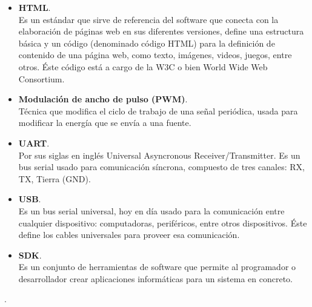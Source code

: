 \begin{itemize}
	\item \textbf{HTML}. \\
Es un estándar que sirve de referencia del software que conecta con la 
elaboración de páginas web en sus diferentes versiones, define una estructura 
básica y un código (denominado código HTML) para la definición de contenido de 
una página web, como texto, imágenes, videos, juegos, entre otros. Éste código 
está a cargo de la W3C o bien World Wide Web Consortium.

	\item \textbf{Modulación de ancho de pulso (PWM)}. \\
Técnica que modifica el ciclo de trabajo de una señal periódica, usada para 
modificar la energía que se envía a una fuente.

	\item \textbf{UART}. \\
Por sus siglas en inglés Universal Asyncronous Receiver/Transmitter. Es un bus
serial usado para comunicación síncrona, compuesto de tres canales: RX, TX, 
Tierra (GND).

	\item \textbf{USB}. \\
Es un bus serial universal, hoy en día usado para la comunicación entre 
cualquier dispositivo: computadoras, periféricos, entre otros dispositivos. Éste
define los cables universales para proveer esa comunicación.

	\item \textbf{SDK}. \\
Es un conjunto de herramientas de software que permite al programador o 
desarrollador crear aplicaciones informáticas para un sistema en concreto.

\end{itemize}

.\\ \\
